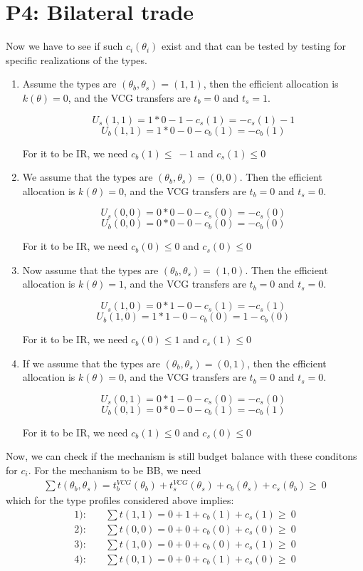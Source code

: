 \documentclass{article}
\newcommand{\enterProblemHeader}[1]{
\nobreak\extramarks{#1}{#1 continued on next page\ldots}\nobreak
\nobreak\extramarks{#1 (continued)}{#1 continued on next page\ldots}\nobreak
}
\newcommand{\exitProblemHeader}[1]{
\nobreak\extramarks{#1 (continued)}{#1 continued on next page\ldots}\nobreak
\nobreak\extramarks{#1}{}\nobreak
}
\newcounter{homeworkProblemCounter} %
\newcommand{\homeworkProblemName}{}
\newenvironment{ex}[1][Problem \arabic{homeworkProblemCounter}]{ %
\stepcounter{homeworkProblemCounter} %
\renewcommand{\homeworkProblemName}{#1} %
\section{\homeworkProblemName} %
}{
}
\begin{document}
\begin{ex}[P4: Bilateral trade]
	Now we have to see if such $c_i(\theta_i)$ exist and that can be tested by testing for specific realizations of the types.\\
	
	\begin{enumerate} 
	\item Assume the types are $(\theta_b,\theta_s)=(1,1)$, then the efficient allocation is $k(\theta)=0$, and the VCG transfers are $t_b=0$ and $t_s=1$. 
	
	$$U_s(1,1)=1*0-1-c_s(1)=-c_s(1)-1$$
	$$U_b(1,1)=1*0-0-c_b(1)=-c_b(1)$$
	
	For it to be IR, we need 
	$c_b(1)\leq\ -1 $
	and $c_s(1) \leq 0$
	
	\item We assume that the types are $(\theta_b,\theta_s)=(0,0)$. Then the efficient allocation is $k(\theta)=0$, and the VCG transfers are $t_b=0$ and $t_s=0$. 
	
	$$U_s(0,0)=0*0-0-c_s(0)=-c_s(0)$$
	$$U_b(0,0)=0*0-0-c_b(0)=-c_b(0)$$
	
	For it to be IR, we need 
	$c_b(0)\leq 0 $
	and $c_s(0) \leq 0$
	
	\item Now assume that the types are $(\theta_b,\theta_s)=(1,0)$. Then the efficient allocation is $k(\theta)=1$, and the VCG transfers are $t_b=0$ and $t_s=0$. 
	
	$$U_s(1,0)=0*1-0-c_s(1)=-c_s(1)$$
	$$U_b(1,0)=1*1-0-c_b(0)=1-c_b(0)$$
	
	For it to be IR, we need 
	$c_b(0)\leq 1 $
	and $c_s(1) \leq 0$ \\
	
	\item If we assume that the types are $(\theta_b,\theta_s)=(0,1)$, then the efficient allocation is $k(\theta)=0$, and the VCG transfers are $t_b=0$ and $t_s=0$. 
	
	$$U_s(0,1)=0*1-0-c_s(0)=-c_s(0)$$
	$$U_b(0,1)=0*0-0-c_b(1)=-c_b(1)$$
	
	For it to be IR, we need 
	$c_b(1)\leq 0 $
	and $c_s(0) \leq 0$ \\
	\end{enumerate}
	
	Now, we can check if the mechanism is still budget balance with these conditons for $c_i$.
	For the mechanism to be BB, we need 
	\begin{align*}
		\sum t(\theta_b,\theta_s)=t_b^{VCG}(\theta_b)+t_s^{VCG}(\theta_s)+c_b(\theta_s)+c_s(\theta_b) \geq\ 0
	\end{align*}
	which for the type profiles considered above implies:
	\begin{align*}
		1): &\quad \sum t(1,1)=0+1+c_b(1)+c_s(1) \geq\ 0 
		\\
		2): &\quad \sum t(0,0)=0+0+c_b(0)+c_s(0) \geq\ 0
		\\
		3): &\quad \sum t(1,0)=0+0+c_b(0)+c_s(1) \geq\ 0
		\\
		4): &\quad \sum t(0,1)=0+0+c_b(1)+c_s(0) \geq\ 0
	\end{align*}
	

\end{ex}
\end{document}
